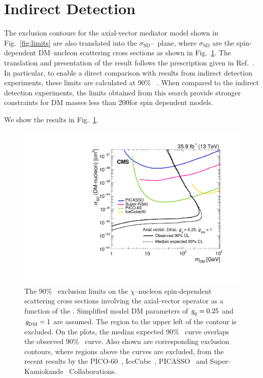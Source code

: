 \section{Indirect Detection}

The exclusion contours for the axial-vector mediator model shown in Fig.~\ref{fig:limits} are also translated into the $\sigma_{\text{SD}}$--\mdm\ plane, where $\sigma_{\text{SD}}$ are the spin-dependent DM--nucleon scattering cross sections as shown in Fig.~\ref{fig:limits_indirect}. 
The translation and presentation of the result follows the prescription given in Ref.~\cite{Boveia:2016mrp}.
In particular, to enable a direct comparison with results from indirect detection experiments, these limits are calculated at 90\% \CL~\cite{dmforum}.
When compared to the indirect detection experiments, the limits obtained from this search provide stronger constraints for DM masses less than 200\GeV for spin dependent models.

We show the results in Fig.~\ref{fig:limits_indirect}.

\begin{figure}[htbp]
  \centering
    \includegraphics[width=0.48\linewidth]{Impact/Figures/limits_indirect.pdf}
    \caption{
      The 90\% \CL\ exclusion limits on the $\chi$--nucleon spin-dependent scattering cross sections involving the axial-vector operator as a function of the \mdm.
      Simplified model DM parameters of $\gq=0.25$ and $\gDM=1$ are assumed.
      The region to the upper left of the contour is excluded. 
      On the plots, the median expected 90\% \CL\ curve overlaps the observed 90\% \CL\ curve.
      Also shown are corresponding exclusion contours, where regions above the curves are excluded, from the recent results by the PICO-60~\cite{Amole:2017dex}, IceCube~\cite{Aartsen:2016exj}, PICASSO~\cite{Behnke:2016lsk} and Super-Kamiokande~\cite{Choi:2015ara} Collaborations.
    }
    \label{fig:limits_indirect}
\end{figure}
